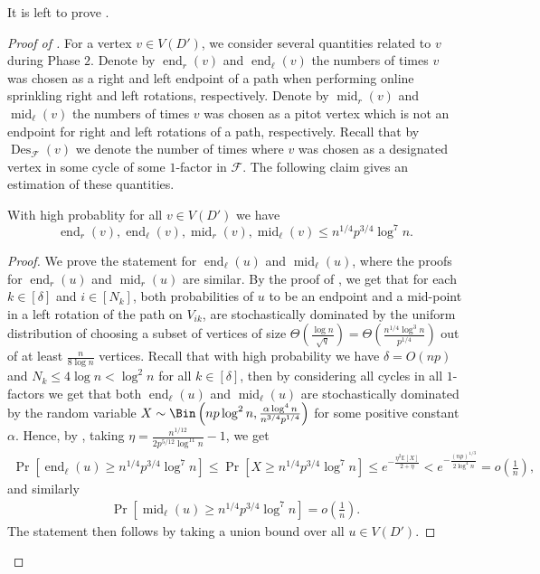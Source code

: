 \documentclass{article}
\DeclareMathOperator{\e}{end}
\DeclareMathOperator{\m}{mid}
\DeclareMathOperator{\Des}{Des}
\begin{document}
	It is left to prove .
	\begin{proof}[Proof of ]
		For a vertex $v \in V(D')$, we consider several quantities related to $v$ during Phase $2$.
		Denote by $\e_r(v)$ and $\e_{\ell}(v)$ the numbers of times $v$ was chosen as a right and left endpoint of a path when performing online sprinkling right and left rotations, respectively.
		Denote by $\m_r(v)$ and $\m_{\ell}(v)$ the numbers of times $v$ was chosen as a pitot vertex which is not an endpoint for right and left rotations of a path, respectively.
		Recall that by $\Des_{\mathcal F}(v)$ we denote the number of times where $v$ was chosen as a designated vertex in some cycle of some $1$-factor in $\mathcal F$.
		The following claim gives an estimation of these quantities.
		\begin{claim}
			\label{clm:uvProb4}
			With high probablity for all $v \in V(D')$ we have
			\[\e_r(v), \e_{\ell}(v), \m_r(v), \m_{\ell}(v) \le n^{1/4}p^{3/4}\log^7 n. \]
		\end{claim}
		
		\begin{proof}
			We prove the statement for $\e_{\ell}(u)$ and $\m_{\ell}(u)$, where the proofs for $\e_r(u)$ and $\m_r(u)$ are similar.
			By the proof of , we get that for each $k \in [\delta]$ and $i \in [N_k]$, both probabilities of $u$ to be an endpoint and a mid-point in a left rotation of the path on $V_{ik}$, are stochastically dominated by the uniform distribution of choosing a subset of vertices of size $\Theta\left(\frac{\log n}{\sqrt{q}} \right) = \Theta\left(\frac{n^{1/4}\log^3 n}{p^{1/4}} \right)$ out of at least $\frac{n}{8\log n}$ vertices.
			Recall that with high probability we have $\delta = O(np)$ and $N_k \le 4\log n < \log^2 n$ for all $k \in [\delta]$, then by considering all cycles in all $1$-factors we get that both $\e_{\ell}(u)$ and $\m_{\ell}(u)$ are stochastically dominated by the random variable $X \sim \Bin\left(np\log^2 n, \frac{\alpha\log^4 n}{n^{3/4}p^{1/4}} \right)$ for some positive constant $\alpha$.
			Hence, by , taking $\eta = \frac{n^{1/12}}{2p^{5/12}\log^{11}n} - 1$, we get
			\begin{align*}
			\Pr\left[\e_{\ell}(u) \ge n^{1/4}p^{3/4}\log^7 n \right] \le \Pr\left[X \ge n^{1/4}p^{3/4}\log^7 n \right] 
			\le e^{-\frac{\eta^2 \mathbb E[X]}{2+\eta}} 
			< e^{-\frac{(np)^{1/3}}{2\log^4 n}}
			= o\left(\tfrac{1}{n} \right),
			\end{align*}
			and similarly
			\begin{align*}
			\Pr\left[\m_{\ell}(u) \ge n^{1/4}p^{3/4}\log^7 n \right] = o\left(\tfrac{1}{n} \right).
			\end{align*}
			The statement then follows by taking a union bound over all $u \in V(D')$.
		\end{proof}
		

\end{proof}
\end{document}
